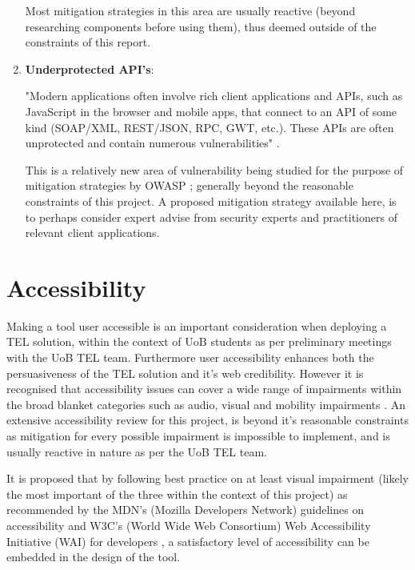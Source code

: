 \begin{enumerate}
    Most mitigation strategies in this area are usually reactive (beyond researching components before using them), thus deemed outside of the constraints of this report.
    
    \item \textbf{Underprotected API's}:
    
    "Modern applications often involve rich client applications and APIs, such as JavaScript in the browser and mobile apps, that connect to an API of some kind (SOAP/XML, REST/JSON, RPC, GWT, etc.). These APIs are often unprotected and contain numerous vulnerabilities" \cite{OWASP2017}.
    
    This is a relatively new area of vulnerability being studied for the purpose of mitigation strategies by OWASP \cite{OWASP2017}; generally beyond the reasonable constraints of this project. A proposed mitigation strategy available here, is to perhaps consider expert advise from security experts and practitioners of relevant client applications.
    
\end{enumerate}




\section{Accessibility}

Making a tool user accessible is an important consideration when deploying a TEL solution, within the context of UoB students as per preliminary meetings with the UoB TEL team. Furthermore user accessibility enhances both the persuasiveness of the TEL solution and it's web credibility. However it is recognised that accessibility issues can cover a wide range of impairments within the broad blanket categories such as audio, visual and mobility impairments \cite{Mills2015}. An extensive accessibility review for this project, is beyond it's reasonable constraints as mitigation for every possible impairment is impossible to implement, and is usually reactive in nature as per the UoB TEL team.

It is proposed that by following best practice on at least visual impairment (likely the most important of the three within the context of this project) as recommended by the MDN's (Mozilla Developers Network) guidelines \cite{Mills2015,Mills2016} on accessibility and W3C's (World Wide Web Consortium) Web Accessibility Initiative (WAI) for developers \cite{W3C}, a satisfactory level of accessibility can be embedded in the design of the tool.

